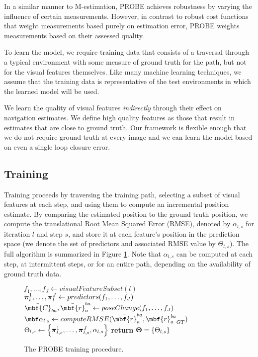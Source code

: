 \documentclass[letterpaper, 10 pt, conference]{ieeeconf}  %
\begin{document}
In a similar manner to M-estimation, PROBE achieves robustness by varying the influence of certain measurements.
However, in contrast to robust cost functions that weight measurements based purely on estimation error, PROBE weights measurements based on their assessed quality.

To learn the model, we require training data that consists of a traversal through a typical environment with some measure of ground truth for the path, but not for the visual features themselves. Like many machine learning techniques, we assume that the training data is representative of the test environments in which the learned model will be used. 

We learn the quality of visual features \textit{indirectly} through their effect on navigation estimates. We define high quality features as those that result in estimates that are close to ground truth. Our framework is flexible enough that we do not require ground truth at every image and we can learn the model based on even a single loop closure error.

\subsection{Training}
Training proceeds by traversing the training path, selecting a subset of visual features at each step, and using them to compute an incremental position estimate. By comparing the estimated position to the ground truth position, we compute the translational Root Mean Squared Error (RMSE), denoted by $ \alpha_{l,s} $ for iteration $l$ and step $s$, and store it at each feature's position in the prediction space (we denote the set of predictors and associated RMSE value by $\Theta_{l,s}$). The full algorithm is summarized in Figure \ref{fig:ProbeTraining}. Note that $\alpha_{l,s}$ can be computed at each step, at intermittent steps, or for an entire path, depending on the availability of ground truth data.
\begin{figure}[h]
\begin{algorithmic}[1]
	\State $f_1, \dots, f_J \gets visualFeatureSubset(l)$
	\State $\boldsymbol{\pi}^1_l, \dots, \boldsymbol{\pi}^J_l \gets predictors(f_1, \dots, f_J)$
	\State $\bar{\mbf{C}}_{ba},  \bar{\mbf{r}}_a^{ba} \gets poseChange(f_1, \dots, f_J)$
	\State $\mbf \alpha_{l,s}  \gets computeRMSE(\bar{\mbf{r}}_a^{ba}, {\mbf{r}_{a}^{ba}}_{GT} )$
	\State  $ \Theta_{l,s} \gets \left\{\boldsymbol{\pi}^1_{l,s}, \dots, \boldsymbol{\pi}^J_{l,s}, \alpha_{l,s}\right\}$
\EndFor
\EndFor
\State \textbf{return} $\boldsymbol{\Theta} = \{ \Theta_{l,s} \}$
\EndProcedure
\end{algorithmic}
\caption{The PROBE training procedure.}\label{fig:ProbeTraining}
\end{figure}
\end{document}
